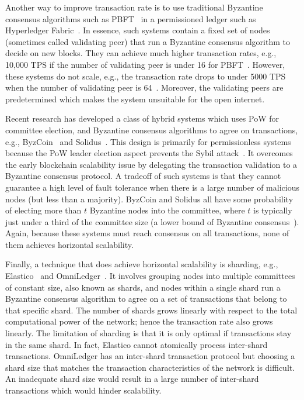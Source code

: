 Another way to improve transaction rate is to use traditional Byzantine consensus algorithms such as PBFT~\cite{castro1999practical} in a permissioned ledger such as Hyperledger Fabric~\cite{cachin2016architecture}.
In essence, such systems contain a fixed set of nodes (sometimes called validating peer) that run a Byzantine consensus algorithm to decide on new blocks.
They can achieve much higher transaction rates, e.g., 10,000 TPS if the number of validating peer is under 16 for PBFT~\cite[Section 5.2]{miller2016honey}.
However, these systems do not scale, e.g., the transaction rate drops to under 5000 TPS when the number of validating peer is 64~\cite[Section 5.2]{miller2016honey}.
Moreover, the validating peers are predetermined which makes the system unsuitable for the open internet.

Recent research has developed a class of hybrid systems which uses PoW for committee election,
and Byzantine consensus algorithms to agree on transactions, e.g., ByzCoin~\cite{kogias2016enhancing} and Solidus~\cite{abraham2016solidus}.
This design is primarily for permissionless systems because the PoW leader election aspect prevents the Sybil attack~\cite{douceur2002sybil}.
It overcomes the early blockchain scalability issue by delegating the transaction validation to a Byzantine consensus protocol.
A tradeoff of such systems is that they cannot guarantee a high level of fault tolerance when there is a large number of malicious nodes (but less than a majority).
ByzCoin and Solidus all have some probability of electing more than $t$ Byzantine nodes into the committee,
where $t$ is typically just under a third of the committee size (a lower bound of Byzantine consensus~\cite{pease1980reaching}).
Again, because these systems must reach consensus on all transactions,
none of them achieves horizontal scalability.

Finally, a technique that does achieve horizontal scalability is sharding, e.g., Elastico~\cite{luu2016elastico} and OmniLedger~\cite{kokoris2017omniledger}.
It involves grouping nodes into multiple committees of constant size, also known as shards,
and nodes within a single shard run a Byzantine consensus algorithm to agree on a set of transactions that belong to that specific shard.
The number of shards grows linearly with respect to the total computational power of the network;
hence the transaction rate also grows linearly.
The limitation of sharding is that it is only optimal if transactions stay in the same shard.
In fact, Elastico cannot atomically process inter-shard transactions.
OmniLedger has an inter-shard transaction protocol but choosing a shard size that matches the transaction characteristics of the network is difficult.
An inadequate shard size would result in a large number of inter-shard transactions which would hinder scalability.

